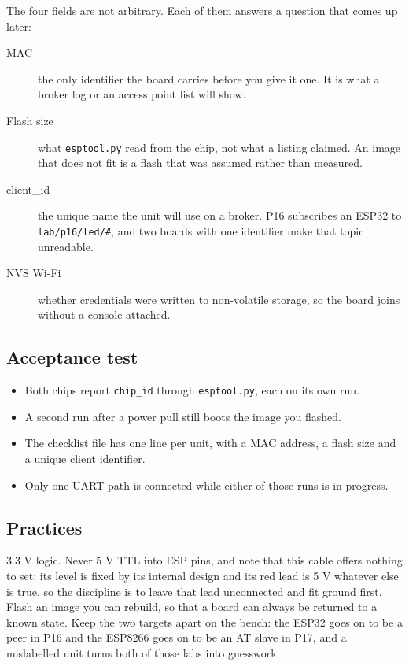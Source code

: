 The four fields are not arbitrary. Each of them answers a question that comes up later:

\begin{description}
\item[MAC] the only identifier the board carries before you give it one. It is what a broker log or an access point list will show.
\item[Flash size] what \texttt{esptool.py} read from the chip, not what a listing claimed. An image that does not fit is a flash that was assumed rather than measured.
\item[client\_id] the unique name the unit will use on a broker. P16 subscribes an ESP32 to \texttt{lab/p16/led/\#}, and two boards with one identifier make that topic unreadable.
\item[NVS Wi-Fi] whether credentials were written to non-volatile storage, so the board joins without a console attached.
\end{description}

\subsection*{Acceptance test}

\begin{itemize}
\item Both chips report \texttt{chip\_id} through \texttt{esptool.py}, each on its own run.
\item A second run after a power pull still boots the image you flashed.
\item The checklist file has one line per unit, with a MAC address, a flash size and a unique client identifier.
\item Only one UART path is connected while either of those runs is in progress.
\end{itemize}

\subsection*{Practices}

3.3 V logic. Never 5 V TTL into ESP pins, and note that this cable offers nothing to set: its level is fixed by its internal design and its red lead is 5 V whatever else is true, so the discipline is to leave that lead unconnected and fit ground first. Flash an image you can rebuild, so that a board can always be returned to a known state. Keep the two targets apart on the bench: the ESP32 goes on to be a peer in P16 and the ESP8266 goes on to be an AT slave in P17, and a mislabelled unit turns both of those labs into guesswork.

